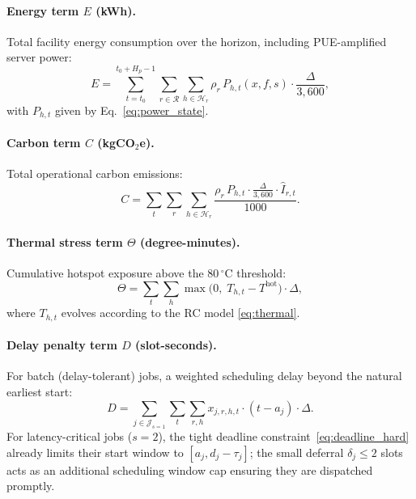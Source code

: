 \documentclass[a4paper,fleqn]{cas-dc}
\begin{document}
\paragraph{Energy term $E$ (kWh).}
Total facility energy consumption over the horizon, including PUE-amplified server power:
\begin{equation}
\label{eq:obj_energy}
E = \sum_{t=t_0}^{t_0+H_p-1} \sum_{r \in \mathcal{R}} \sum_{h \in \mathcal{H}_r} \rho_r \, P_{h,t}(x,f,s) \cdot \frac{\Delta}{3{,}600},
\end{equation}
with $P_{h,t}$ given by Eq.~\eqref{eq:power_state}.

\paragraph{Carbon term $C$ (kgCO$_2$e).}
Total operational carbon emissions:
\begin{equation}
\label{eq:obj_carbon}
C = \sum_{t} \sum_{r} \sum_{h \in \mathcal{H}_r} \frac{\rho_r \, P_{h,t} \cdot \frac{\Delta}{3{,}600} \cdot \hat{I}_{r,t}}{1000}.
\end{equation}

\paragraph{Thermal stress term $\Theta$ (degree-minutes).}
Cumulative hotspot exposure above the 80$\,^\circ$C threshold:
\begin{equation}
\label{eq:obj_thermal}
\Theta = \sum_{t} \sum_{h} \max\!\bigl(0,\; T_{h,t} - T^{\mathrm{hot}}\bigr) \cdot \Delta,
\end{equation}
where $T_{h,t}$ evolves according to the RC model \eqref{eq:thermal}.

\paragraph{Delay penalty term $D$ (slot-seconds).}
For batch (delay-tolerant) jobs, a weighted scheduling delay beyond the natural earliest start:
\begin{equation}
\label{eq:obj_delay}
D = \sum_{j \in \mathcal{J}_{s=1}} \sum_{t} \sum_{r,h} x_{j,r,h,t} \cdot (t - a_j) \cdot \Delta.
\end{equation}
For latency-critical jobs ($s=2$), the tight deadline constraint~\eqref{eq:deadline_hard} already limits their start window to $[a_j, d_j - \tau_j]$; the small deferral $\delta_j \leq 2$ slots acts as an additional scheduling window cap ensuring they are dispatched promptly.
\end{document}
